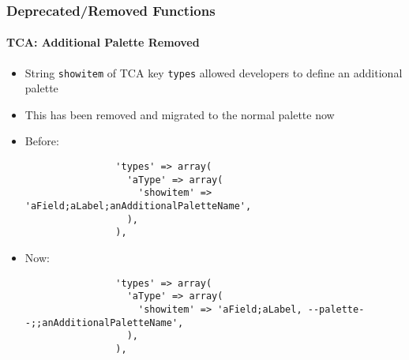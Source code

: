 \begin{frame}[fragile]
	\frametitle{Deprecated/Removed Functions}
	\framesubtitle{TCA: Additional Palette Removed}

	\lstset{basicstyle=\tiny\ttfamily}

	\begin{itemize}

		\item String \texttt{showitem} of TCA key \texttt{types} allowed developers to define
			an additional palette

		\item This has been removed and migrated to the normal palette now

		\item Before:

			\begin{lstlisting}
				'types' => array(
				  'aType' => array(
				    'showitem' => 'aField;aLabel;anAdditionalPaletteName',
				  ),
				),
			\end{lstlisting}

		\item Now:

			\begin{lstlisting}
				'types' => array(
				  'aType' => array(
				    'showitem' => 'aField;aLabel, --palette--;;anAdditionalPaletteName',
				  ),
				),
			\end{lstlisting}

	\end{itemize}

\end{frame}


